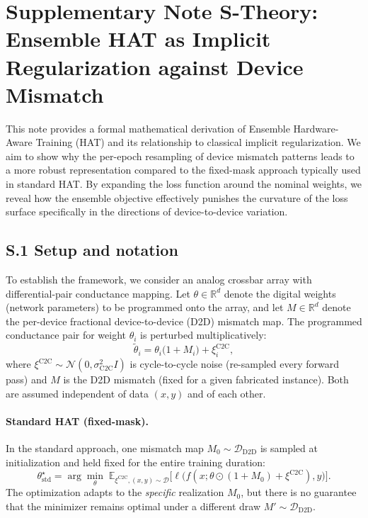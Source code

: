 
\section*{Supplementary Note S-Theory: Ensemble HAT as Implicit Regularization against Device Mismatch}
\label{supp:theory-ensemble-hat}

This note provides a formal mathematical derivation of Ensemble Hardware-Aware Training (HAT) and its relationship to classical implicit regularization. We aim to show why the per-epoch resampling of device mismatch patterns leads to a more robust representation compared to the fixed-mask approach typically used in standard HAT. By expanding the loss function around the nominal weights, we reveal how the ensemble objective effectively punishes the curvature of the loss surface specifically in the directions of device-to-device variation.

\subsection*{S.1 Setup and notation}

To establish the framework, we consider an analog crossbar array with differential-pair conductance mapping. Let $\theta \in \mathbb{R}^d$ denote the digital weights (network parameters) to be programmed onto the array, and let $M \in \mathbb{R}^d$ denote the per-device fractional device-to-device (D2D) mismatch map. The programmed conductance pair for weight $\theta_i$ is perturbed multiplicatively:
\begin{equation}
    \tilde{\theta}_i = \theta_i \bigl(1 + M_i\bigr) + \xi_i^{\text{C2C}},
    \label{eq:weight-perturbation}
\end{equation}
where $\xi^{\text{C2C}} \sim \mathcal{N}(0, \sigma_{\text{C2C}}^2 I)$ is cycle-to-cycle noise (re-sampled every forward pass) and $M$ is the D2D mismatch (fixed for a given fabricated instance). Both are assumed independent of data $(x,y)$ and of each other.

\paragraph{Standard HAT (fixed-mask).} In the standard approach, one mismatch map $M_0 \sim \mathcal{D}_{\text{D2D}}$ is sampled at initialization and held fixed for the entire training duration:
\begin{equation}
    \theta_{\text{std}}^{\star} = \arg\min_{\theta} \; \mathbb{E}_{\xi^{\text{C2C}}, (x,y) \sim \mathcal{D}} \bigl[ \ell\bigl(f(x; \theta \odot (1+M_0) + \xi^{\text{C2C}}), y\bigr) \bigr].
    \label{eq:standard-hat-objective}
\end{equation}
The optimization adapts to the \emph{specific} realization $M_0$, but there is no guarantee that the minimizer remains optimal under a different draw $M' \sim \mathcal{D}_{\text{D2D}}$.

